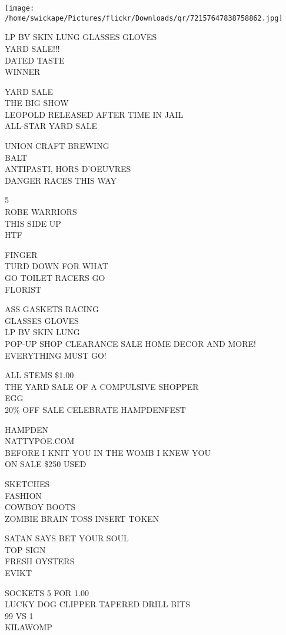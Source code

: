 \documentclass[10pt,letterpaper]{article}
\begin{document}
\texttt{[image: /home/swickape/Pictures/flickr/Downloads/qr/72157647838758862.jpg]}


LP BV SKIN LUNG GLASSES GLOVES\\
YARD SALE!!!\\
DATED TASTE\\
WINNER

YARD SALE\\
THE BIG SHOW\\
LEOPOLD RELEASED AFTER TIME IN JAIL\\
ALL{-}STAR YARD SALE

UNION CRAFT BREWING\\
BALT\\
ANTIPASTI, HORS D'OEUVRES\\
DANGER RACES THIS WAY

5\\
ROBE WARRIORS\\
THIS SIDE UP\\
HTF

FINGER\\
TURD DOWN FOR WHAT\\
GO TOILET RACERS GO\\
FLORIST

ASS GASKETS RACING\\
GLASSES GLOVES\\
LP BV SKIN LUNG\\
POP{-}UP SHOP CLEARANCE SALE HOME DECOR AND MORE! EVERYTHING MUST GO!

ALL STEMS \$1.00\\
THE YARD SALE OF A COMPULSIVE SHOPPER\\
EGG\\
20\% OFF SALE CELEBRATE HAMPDENFEST

HAMPDEN\\
NATTYPOE.COM\\
BEFORE I KNIT YOU IN THE WOMB I KNEW YOU\\
ON SALE \$250 USED

SKETCHES\\
FASHION\\
COWBOY BOOTS\\
ZOMBIE BRAIN TOSS INSERT TOKEN

SATAN SAYS BET YOUR SOUL\\
TOP SIGN\\
FRESH OYSTERS\\
EVIKT

SOCKETS 5 FOR 1.00\\
LUCKY DOG CLIPPER TAPERED DRILL BITS\\
99 VS 1\\
KILAWOMP
\end{document}
